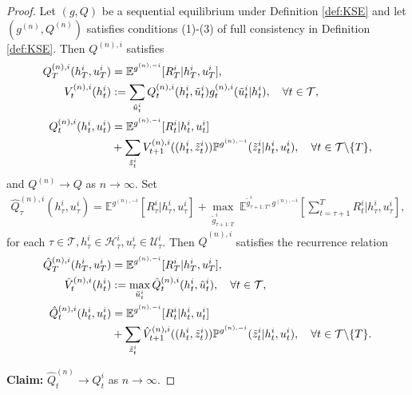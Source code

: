 \documentclass[pdflatex,sn-basic]{sn-jnl}
\newcommand{\E}{\mathbb{E}}
\renewcommand{\Pr}{\mathbb{P}}
\newcommand{\Qfunc}{Q}
\theoremstyle{thmstyleone}%
\theoremstyle{thmstyletwo}%
\theoremstyle{thmstylethree}%
\begin{document}
\begin{appendices}
\begin{proof}
		Let $(g, \Qfunc)$ be a sequential equilibrium under Definition \ref{def:KSE} and let $(g^{(n)}, \Qfunc^{(n)})$ satisfies conditions (1)-(3) of full consistency in Definition \ref{def:KSE}. Then $\Qfunc^{(n), i}$ satisfies 
        \begin{subequations}
		\begin{align}
			\Qfunc_T^{(n), i}(h_T^i, u_T^i) &= \E^{g^{(n), -i}}[R_T^i|h_T^i, u_T^i],\\
			V_t^{(n), i}(h_t^i) &:= \sum_{\tilde{u}_t^i} \Qfunc_t^{(n), i}(h_t^i, \tilde{u}_t^i)g_t^{(n), i}(\tilde{u}_t^i|h_t^i), \quad \forall t\in\mathcal{T},\\
			\Qfunc_{t}^{(n), i}(h_t^i, u_t^i) &= \E^{g^{(n), -i}}[R_t^i|h_t^i, u_t^i]\notag \\
			&+ \sum_{\tilde{z}_{t}^i} V_{t+1}^{(n), i}((h_t^i, \tilde{z}_{t}^i)) \Pr^{g^{(n), -i}}(\tilde{z}_{t}^i|h_t^i, u_t^i),\quad \forall t\in\mathcal{T}\backslash\{T\},\label{eq:appSE:2:Qnt}
		\end{align}
        \end{subequations}
		and $\Qfunc^{(n)} \rightarrow \Qfunc$ as $n\rightarrow\infty$.	
		Set
		\begin{align}
			\hat{\Qfunc}_\tau^{(n), i}(h_\tau^i, u_\tau^i) = \E^{g^{(n), -i}}[R_\tau^i|h_\tau^i, u_\tau^i] + \underset{\tilde{g}_{\tau+1:T}^i}{\max}~\E^{\tilde{g}_{\tau+1:T}^i, g^{(n), -i}}\left[\sum_{t=\tau+1}^T R_t^i\Big|h_\tau^i, u_\tau^i\right],
		\end{align}
		for each $\tau\in\mathcal{T}, h_\tau^i\in \mathcal{H}_\tau^i, u_\tau^i\in \mathcal{U}_\tau^i$. Then $\hat{\Qfunc}^{(n), i}$ satisfies the recurrence relation
        \begin{subequations}
		\begin{align}
			\hat{\Qfunc}_T^{(n), i}(h_T^i, u_T^i) &= \E^{g^{(n), -i}}[R_T^i|h_T^i, u_T^i],\\
			\hat{V}_t^{(n), i}(h_t^i) &:= \max_{\tilde{u}_t^i} \hat{\Qfunc}_t^{(n), i}(h_t^i, \tilde{u}_t^i), \quad \forall t\in\mathcal{T},\\
			\hat{\Qfunc}_{t}^{(n), i}(h_t^i, u_t^i) &= \E^{g^{(n), -i}}[R_t^i|h_t^i, u_t^i] \notag\\
			&+ \sum_{\tilde{z}_{t}^i} \hat{V}_{t+1}^{(n), i}((h_t^i, \tilde{z}_{t}^i)) \Pr^{g^{(n), -i}}(\tilde{z}_{t}^i|h_t^i, u_t^i),\quad \forall t\in\mathcal{T}\backslash\{T\}.\label{eq:appSE:2:hatQnt}
		\end{align}
        \end{subequations}
	
		\textbf{Claim:} $\hat{\Qfunc}_{t}^{(n)} \rightarrow \Qfunc_{t}^{i}$ as $n\rightarrow\infty$.
		

\end{proof}
\end{appendices}
\end{document}
